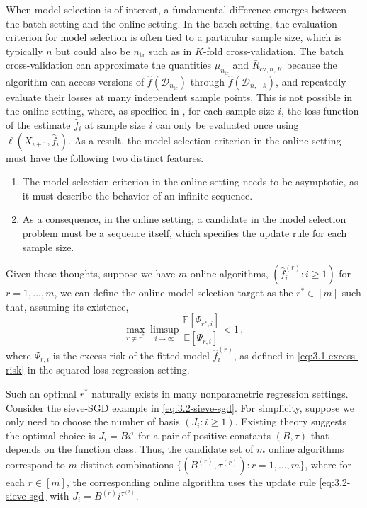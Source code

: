 \documentclass[11pt]{article}
\theoremstyle{plain}
\newcommand{\cv}{{\mathrm{cv}}}
\newcommand{\tr}{{\mathrm{tr}}}
\newcommand{\D}{{\mathcal{D}}}
\begin{document}
When model selection is of interest, a fundamental difference emerges between the batch setting and the online setting.  In the batch setting, the evaluation criterion for model selection is often tied to a particular sample size, which is typically $n$ but could also be $n_\tr$ such as in $K$-fold cross-validation.  The batch cross-validation can approximate the quantities $\mu_{n_\tr}$ and $\bar R_{\cv,n,K}$ because the algorithm can access versions of $\hat f(\D_{n_\tr})$ through $\hat f(\D_{n,-k})$, and repeatedly evaluate their losses at many independent sample points.   This is not possible in the online setting, where, as specified in , for each sample size $i$, the loss function of the estimate $\hat f_i$ at sample size $i$ can only be evaluated once using $\ell(X_{i+1}, \hat f_i)$. As a result, the model selection criterion in the online setting must have the following two distinct features.
\begin{enumerate}
    \item The model selection criterion in the online setting needs to be asymptotic, as it must describe the behavior of an infinite sequence.
    \item As a consequence, in the online setting, a candidate in the model selection problem must be a sequence itself, which specifies the update rule for each sample size.
\end{enumerate}
Given these thoughts, suppose we have $m$ online algorithms, $(\hat f_i^{(r)}:i\ge 1)$ for $r=1,...,m$, we can define the online model selection target as the $r^*\in[m]$ such that, assuming its existence, 
\begin{equation}\label{eq:3.2-online-criterion}
\max_{r\neq r^*}\limsup_{i\rightarrow\infty}\frac{\mathbb E \left[\Psi_{r^*,i}\right]}{\mathbb E \left[\Psi_{r,i}\right]} < 1\,,
\end{equation}
where $\Psi_{r,i}$ is the excess risk of the fitted model $\hat f_i^{(r)}$, as defined in \eqref{eq:3.1-excess-risk} in the squared loss regression setting.

Such an optimal $r^*$ naturally exists in many nonparametric regression settings. Consider the sieve-SGD example in \eqref{eq:3.2-sieve-sgd}. For simplicity, suppose we only need to choose the number of basis $(J_i:i\ge 1)$. Existing theory \cite{zhang2022sieve} suggests the optimal choice is $J_i=B i^\tau$ for a pair of positive constants $(B,\tau)$ that depends on the function class.  Thus, the candidate set of $m$ online algorithms correspond to $m$ distinct combinations $\{(B^{(r)},\tau^{(r)}):r=1,...,m\}$, where for each $r\in[m]$, the corresponding online algorithm uses the update rule \eqref{eq:3.2-sieve-sgd} with $J_i=B^{(r)}i^{\tau^{(r)}}$.
\end{document}
